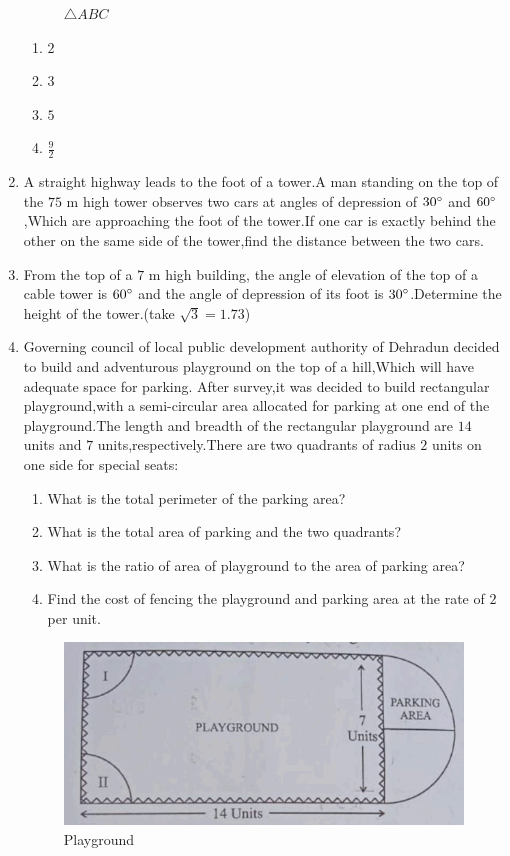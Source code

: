 \documentclass{article}
\begin{document}
\begin{enumerate}
\begin{figure}[!ht]
        \caption{$\triangle ABC$}
        \label{fig:enter-label}
    \end{figure}
            \begin{enumerate}
                \item $2$
                \item $3$
                \item $5$
                \item $\frac{9}{2}$
            \end{enumerate}
    \item A straight highway leads to the foot of a tower.A man standing on the top of the $75$ m high tower observes two cars at angles of depression of $30\degree$ and $60\degree$,Which are approaching the foot of the tower.If one car is exactly behind the other on the same side of the tower,find the distance between the two cars.
    \item From the top of a $7$ m high building, the angle of elevation of the top of a cable tower is $60\degree$ and the angle of depression of its foot is $30\degree$.Determine the height of the tower.(take $\sqrt{3}=1.73$)
    \item Governing council of local public development authority of Dehradun decided to build and adventurous playground on the top of a hill,Which will have adequate space for parking.
    After survey,it was decided to build rectangular playground,with a semi-circular area allocated for parking at one end of the playground.The length and breadth of the rectangular playground are $14$ units and $7$ units,respectively.There are two quadrants of radius $2$ units on one side for special seats:
            \begin{enumerate}
                \item What is the total perimeter of the parking area?
                \item What is the total area of parking and the two quadrants?
                \item What is the ratio of area of playground to the area of parking area?
                \item Find the cost of fencing the playground and parking area at the rate of \rupee $2$ per unit.
            \end{enumerate}
    \begin{figure}[!ht]
        \centering
        \includegraphics[width=\columnwidth]{figs/30-4-3-question36.png}
        \caption{Playground}
        \label{fig:enter-label}
    \end{figure}
\end{enumerate}
\end{document}
